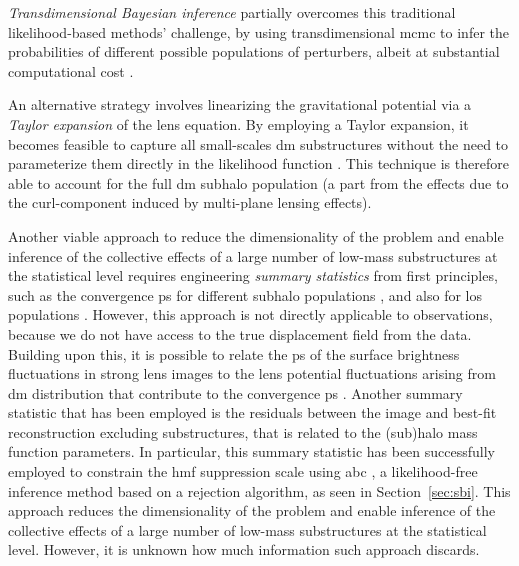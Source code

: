 \emph{Transdimensional Bayesian inference} partially overcomes this traditional likelihood-based methods' challenge, by using transdimensional \gls*{mcmc} to infer the probabilities of different possible populations of perturbers, albeit at substantial computational cost \cite{Brewer:2015yya,Daylan:2017kfh}. 

An alternative strategy involves linearizing the gravitational potential via a \emph{Taylor expansion} of the lens equation. By employing a Taylor expansion, it becomes feasible to capture all small-scales \gls*{dm} substructures without the need to parameterize them directly in the likelihood function \cite{Vegetti:2008eg, Koopmans:2005nr, Galan:2022ifd}. This technique is therefore able to account for the full \gls*{dm} subhalo population (a part from the effects due to the curl-component induced by multi-plane lensing effects).

Another viable approach to reduce the dimensionality of the problem and enable inference of the collective effects of a large number of low-mass substructures at the statistical level requires engineering \emph{summary statistics} from first principles, such as the convergence \gls*{ps} for different subhalo populations \cite{DiazRivero:2017xkd, DiazRivero:2018aa, Brennan:2018jhq}, and also for \gls*{los} populations \cite{CaganSengul:2020nat}. However, this approach is not directly applicable to observations, because we do not have access to the true displacement field from the data. Building upon this, it is possible to relate the \gls*{ps} of the surface brightness fluctuations in strong lens images to the lens potential fluctuations arising from \gls*{dm} distribution that contribute to the convergence \gls*{ps} \cite{Chatterjee:2017orx, Cyr-Racine:2019aa, Bayer:2018vhy}. Another summary statistic that has been employed is the residuals between the image and best-fit reconstruction excluding substructures, that is related to the (sub)halo mass function parameters. In particular, this summary statistic has been successfully employed to constrain the \gls*{hmf} suppression scale using \gls*{abc} \cite{Birrer:2017rpp, He:2020rkj}, a likelihood-free inference method based on a rejection algorithm, as seen in Section~\ref{sec:sbi}. This approach reduces the dimensionality of the problem and enable inference of the collective effects of a large number of low-mass substructures at the statistical level. However, it is unknown how much information such approach discards. 

